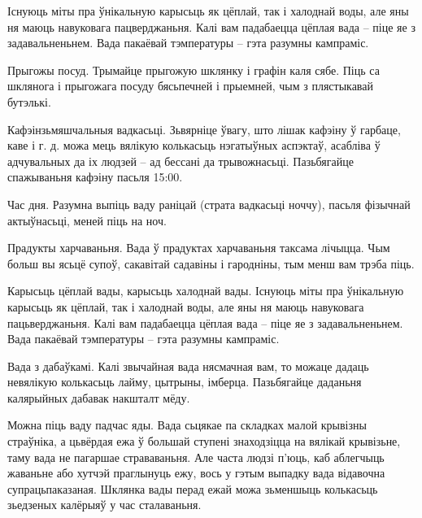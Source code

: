 Існуюць міты пра ўнікальную карысьць як цёплай, так і халоднай воды, але яны ня маюць навуковага пацверджаньня. Калі вам падабаецца цёплая вада – піце яе з задавальненьнем. Вада пакаёвай тэмпературы – гэта разумны кампраміс.

Прыгожы посуд.
Трымайце прыгожую шклянку і графін каля сябе. Піць са шклянога і прыгожага посуду бясьпечней і прыемней, чым з плястыкавай бутэлькі.

Кафэінзьмяшчальныя вадкасьці.
Зьвярніце ўвагу, што лішак кафэіну ў гарбаце, каве і г. д. можа мець вялікую колькасьць нэгатыўных аспэктаў, асабліва ў адчувальных да іх людзей – ад бессані да трывожнасьці. Пазьбягайце спажываньня кафэіну пасьля 15:00.

Час дня.
Разумна выпіць ваду раніцай (страта вадкасьці ноччу), пасьля фізычнай актыўнасьці, меней піць на ноч.

Прадукты харчаваньня.
Вада ў прадуктах харчаваньня таксама лічыцца. Чым больш вы ясьцё супоў, сакавітай садавіны і гародніны, тым менш вам трэба піць.

Карысьць цёплай вады, карысьць халоднай вады.
Існуюць міты пра ўнікальную карысьць як цёплай, так і халоднай воды, але яны ня маюць навуковага пацьверджаньня. Калі вам падабаецца цёплая вада – піце яе з задавальненьнем. Вада пакаёвай тэмпературы – гэта разумны кампраміс.

Вада з дабаўкамі.
Калі звычайная вада нясмачная вам, то можаце дадаць невялікую колькасьць лайму, цытрыны, імберца. Пазьбягайце даданьня калярыйных дабавак накшталт мёду.

Можна піць ваду падчас яды.
Вада сьцякае па складках малой крывізны страўніка, а цьвёрдая ежа ў большай ступені знаходзіцца на вялікай крывізьне, таму вада не пагаршае страваваньня. Але часта людзі п'юць, каб аблегчыць жаваньне або хутчэй праглынуць ежу, вось у гэтым выпадку вада відавочна супрацьпаказаная. Шклянка вады перад ежай можа зьменшыць колькасьць зьедзеных калёрыяў у час сталаваньня.
